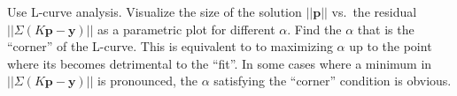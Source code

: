 Use L-curve analysis.
Visualize the size of the solution $|| \mathbf{p} ||$ vs.\ the residual $|| \Sigma ( K \mathbf{p} - \mathbf{y} ) ||$ as a parametric plot for different $\alpha$.
Find the $\alpha$ that is the ``corner'' of the L-curve.
This is equivalent to to maximizing $\alpha$ up to the point where its becomes detrimental to the ``fit''.
In some cases where a minimum in $|| \Sigma ( K \mathbf{p} - \mathbf{y} ) ||$ is pronounced, the $\alpha$ satisfying the ``corner'' condition is obvious.
